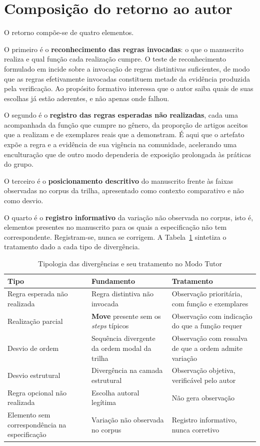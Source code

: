 \section{Composição do retorno ao autor}
\label{sec:retorno}

O retorno compõe-se de quatro elementos.

O primeiro é o \textbf{reconhecimento das regras invocadas}: o que o manuscrito realiza e qual função cada realização cumpre. O teste de reconhecimento formulado em \cite{GenresOrgComm} incide sobre a invocação de regras distintivas suficientes, de modo que as regras efetivamente invocadas constituem metade da evidência produzida pela verificação. Ao propósito formativo interessa que o autor saiba quais de suas escolhas já estão aderentes, e não apenas onde falhou.

O segundo é o \textbf{registro das regras esperadas não realizadas}, cada uma acompanhada da função que cumpre no gênero, da proporção de artigos aceitos que a realizam e de exemplares reais que a demonstram. É aqui que o artefato expõe a regra e a evidência de sua vigência na comunidade, acelerando uma enculturação que de outro modo dependeria de exposição prolongada às práticas do grupo.

O terceiro é o \textbf{posicionamento descritivo} do manuscrito frente às faixas observadas no corpus da trilha, apresentado como contexto comparativo e não como desvio.

O quarto é o \textbf{registro informativo} da variação não observada no corpus, isto é, elementos presentes no manuscrito para os quais a especificação não tem correspondente. Registram-se, nunca se corrigem. A Tabela~\ref{tab:tipologia} sintetiza o tratamento dado a cada tipo de divergência.

\begin{table}[H]
\centering
\caption{Tipologia das divergências e seu tratamento no Modo Tutor}
\label{tab:tipologia}
\small
\begin{tabular}{|p{4.0cm}|p{4.6cm}|p{4.8cm}|}
\hline
\textbf{Tipo} & \textbf{Fundamento} & \textbf{Tratamento} \\
\hline
Regra esperada não realizada & Regra distintiva não invocada \cite{GenresOrgComm} & Observação prioritária, com função e exemplares \\
\hline
Realização parcial & \textbf{Move} presente sem os \textit{steps} típicos \cite{ResearchGenres} & Observação com indicação do que a função requer \\
\hline
Desvio de ordem & Sequência divergente da ordem modal da trilha & Observação com ressalva de que a ordem admite variação \\
\hline
Desvio estrutural & Divergência na camada estrutural & Observação objetiva, verificável pelo autor \\
\hline
Regra opcional não realizada & Escolha autoral legítima \cite{ResearchGenres} & Não gera observação \\
\hline
Elemento sem correspondência na especificação & Variação não observada no corpus & Registro informativo, nunca corretivo \\
\hline
\end{tabular}
\end{table}

